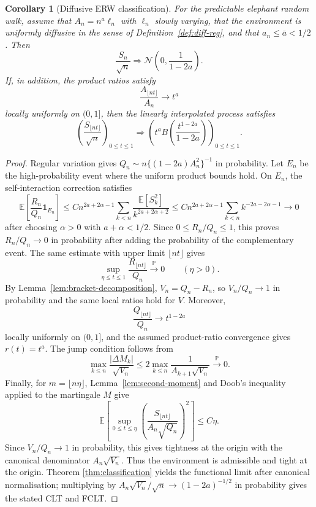 \documentclass[11pt]{article}
\newtheorem{corollary}{Corollary}
\theoremstyle{definition}
\theoremstyle{remark}
\newcommand{\E}{\mathbb{E}}
\newcommand{\Pbb}{\mathbb{P}}
\newcommand{\1}{\mathbf{1}}
\newcommand{\N}{\mathcal{N}}
\begin{document}
\begin{corollary}[Diffusive ERW classification]\label{cor:diffusive}
For the predictable elephant random walk, assume that \(A_n=n^a\ell_n\) with
\(\ell_n\) slowly varying, that the
environment is uniformly diffusive in the sense of Definition~\ref{def:diff-reg},
and that \(a_n\le\bar a<1/2\). Then
\[
  \frac{S_n}{\sqrt n}\Rightarrow
  \N\left(0,\frac1{1-2a}\right).
\]
If, in addition, the product ratios satisfy
\[
  \frac{A_{\lfloor nt\rfloor}}{A_n}\to t^a
  \]
locally uniformly on \((0,1]\), then the linearly interpolated process satisfies
\[
  \left(\frac{S_{\lfloor nt\rfloor}}{\sqrt n}\right)_{0\le t\le1}
  \Rightarrow
  \left(t^aB\left(\frac{t^{1-2a}}{1-2a}\right)\right)_{0\le t\le1}.
\]
\end{corollary}

\begin{proof}
Regular variation gives
\(Q_n\sim n\{(1-2a)A_n^2\}^{-1}\) in probability. Let \(E_n\) be the
high-probability event where the uniform product bounds hold. On \(E_n\), the
self-interaction correction satisfies
\[
  \E\left[\frac{R_n}{Q_n}\1_{E_n}\right]
  \le
  C n^{2a+2\alpha-1}
  \sum_{k<n}\frac{\E[S_k^2]}{k^{2a+2\alpha+2}}
  \le
  C n^{2a+2\alpha-1}
  \sum_{k<n}k^{-2a-2\alpha-1}
  \to0
\]
after choosing \(\alpha>0\) with \(a+\alpha<1/2\). Since \(0\le R_n/Q_n\le1\), this
proves \(R_n/Q_n\to0\) in probability after adding the probability of the
complementary event. The same estimate with upper limit \(\lfloor nt\rfloor\)
gives
\[
  \sup_{\eta\le t\le1}\frac{R_{\lfloor nt\rfloor}}{Q_n}
  \xrightarrow{\Pbb}0
  \qquad(\eta>0).
\]
By Lemma~\ref{lem:bracket-decomposition}, \(V_n=Q_n-R_n\), so \(V_n/Q_n\to1\)
in probability and the same local ratios hold for \(V\).
Moreover,
\[
  \frac{Q_{\lfloor nt\rfloor}}{Q_n}\to t^{1-2a}
\]
locally uniformly on \((0,1]\), and the assumed product-ratio convergence gives
\(r(t)=t^a\). The jump condition follows from
\[
  \max_{k\le n}\frac{|\Delta M_k|}{\sqrt{V_n}}
  \le
  2\max_{k\le n}\frac1{A_{k+1}\sqrt{V_n}}\xrightarrow{\Pbb}0.
\]
Finally, for \(m=\lfloor n\eta\rfloor\), Lemma~\ref{lem:second-moment} and
Doob's inequality applied to the martingale \(M\) give
\[
  \E\left[
  \sup_{0\le t\le\eta}
  \left(\frac{S_{\lfloor nt\rfloor}}{A_n\sqrt{Q_n}}\right)^2
  \right]
  \le C\eta.
\]
Since \(V_n/Q_n\to1\) in probability, this gives tightness at the origin with
the canonical denominator \(A_n\sqrt{V_n}\).
Thus the environment is admissible and tight at the origin. Theorem
\ref{thm:classification} yields the functional limit after canonical
normalisation; multiplying by
\(A_n\sqrt{V_n}/\sqrt n\to(1-2a)^{-1/2}\) in probability gives the stated CLT
and FCLT.
\end{proof}
\end{document}
